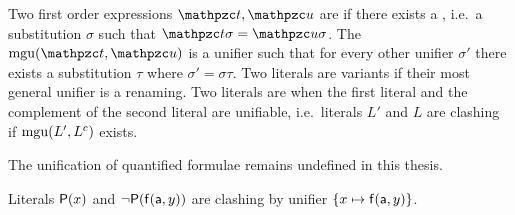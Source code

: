 
\begin{definition}\label{def:unifier}
Two first order expressions \( \mct, \mcu \) are  if there exists a ,
i.e.~a substitution \( \sigma \) such that \( \mct\sigma=\mcu\sigma \).
The  \( \mgu(\mct,\mcu) \) is a unifier such that
for every other unifier \( \sigma' \) there exists a substitution \( \tau \) where
\( \sigma' = \sigma \tau \).
Two literals are variants if their most general unifier is a renaming.
Two literals are  when the first literal
and the complement of the second literal are unifiable,
i.e.~literals \( L' \) and \( L \) are clashing if \( \operatorname{mgu}(L', L^c) \) exists.
\end{definition}

\begin{remark}
	The unification of quantified formulae remains undefined in this thesis.
\end{remark}

\begin{example}
	Literals \( \mathsf{P}(x) \) and \( \lnot\mathsf{P}(\mathsf{f}(\mathsf{a},y)) \)
	are clashing by unifier \( \{ x\mapsto \mathsf{f}(\mathsf{a},y)\} \).
\end{example}